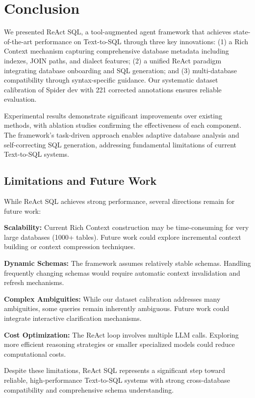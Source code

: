 \section{Conclusion}

We presented ReAct SQL, a tool-augmented agent framework that achieves state-of-the-art performance on Text-to-SQL through three key innovations: (1) a Rich Context mechanism capturing comprehensive database metadata including indexes, JOIN paths, and dialect features; (2) a unified ReAct paradigm integrating database onboarding and SQL generation; and (3) multi-database compatibility through syntax-specific guidance. Our systematic dataset calibration of Spider dev with 221 corrected annotations ensures reliable evaluation.

Experimental results demonstrate significant improvements over existing methods, with ablation studies confirming the effectiveness of each component. The framework's task-driven approach enables adaptive database analysis and self-correcting SQL generation, addressing fundamental limitations of current Text-to-SQL systems.

\subsection{Limitations and Future Work}

While ReAct SQL achieves strong performance, several directions remain for future work:

\textbf{Scalability:} Current Rich Context construction may be time-consuming for very large databases (1000+ tables). Future work could explore incremental context building or context compression techniques.

\textbf{Dynamic Schemas:} The framework assumes relatively stable schemas. Handling frequently changing schemas would require automatic context invalidation and refresh mechanisms.

\textbf{Complex Ambiguities:} While our dataset calibration addresses many ambiguities, some queries remain inherently ambiguous. Future work could integrate interactive clarification mechanisms.

\textbf{Cost Optimization:} The ReAct loop involves multiple LLM calls. Exploring more efficient reasoning strategies or smaller specialized models could reduce computational costs.

Despite these limitations, ReAct SQL represents a significant step toward reliable, high-performance Text-to-SQL systems with strong cross-database compatibility and comprehensive schema understanding.
